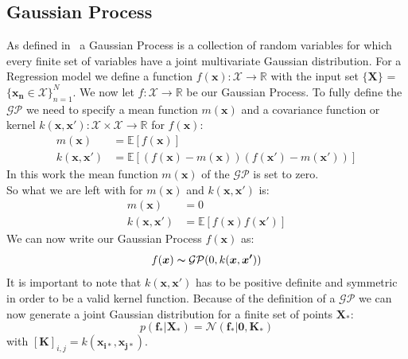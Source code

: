 \documentclass{article}
\begin{document}
\subsection{Gaussian Process} %
As defined in~\cite{RasmussenCarlEdward} a Gaussian Process is a collection of random variables for which every finite set of variables have a joint multivariate Gaussian distribution. For a Regression model we define a function
$f(\bm{x}): \mathcal{X}\rightarrow \mathbb{R}$ with the input set $\{\bm{X}\}$
= $\{\bm{x_n} \in \mathcal{X} \}_{n=1}^N$. We now let $f:
    \mathcal{X}\rightarrow \mathbb{R}$ be our Gaussian Process. To fully define the $\mathcal{GP}$ we need to specify a mean function $m(\bm{x})$ and a covariance function or
kernel $k(\bm{x}, \bm{x'}): \mathcal{X} \times \mathcal{X} \rightarrow
    \mathbb{R}$ for $f(\bm{x})$:
\begin{equation}
    \begin{aligned}
        m(\bm{x})         & = \mathbb{E}[f(\bm{x})]                                    \\
        k(\bm{x},\bm{x'}) & = \mathbb{E}[(f(\bm{x})-m(\bm{x}))(f(\bm{x'})-m(\bm{x'}))]
    \end{aligned}
\end{equation}
In this work the mean function $m(\bm{x})$ of the $\mathcal{GP}$ is set to zero.\\
So what we are left with for  $m(\bm{x})$ and $ k(\bm{x},\bm{x'})$ is:
\begin{equation}
    \begin{aligned}
        m(\bm{x})         & = 0                               \\
        k(\bm{x},\bm{x'}) & = \mathbb{E}[f(\bm{x})f(\bm{x'})]
    \end{aligned}
\end{equation}
We can now write our Gaussian Process $f(\bm{x})$ as:
\begin{equation}
    f(\bm{x})\thicksim \mathcal{G} \mathcal{P}(0,k(\bm{x},\bm{x'}))
\end{equation}
It is important to note that $ k(\bm{x},\bm{x'})$ has to be positive definite and symmetric in order to be a valid kernel function.
Because of the definition of a $\mathcal{GP}$ we can now generate a joint Gaussian distribution for a finite set of points $\bm{X_*}$:
\begin{equation}
    \label{eq:f_star_random_vector}
    p(\bm{f_*|\bm{X_*}}) = \mathcal{N}(\bm{f_*}|\bm{0},\bm{K_*})
\end{equation}
with ${[\bm{K}]}_{i,j} = k(\bm{x_{i*}},\bm{x_{j*}})$.
\end{document}
